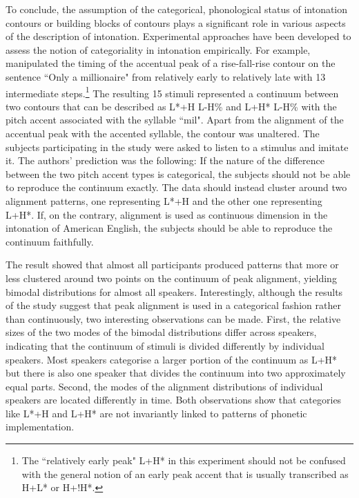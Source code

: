 To conclude, the assumption of the categorical, phonological status of intonation contours or building blocks of contours plays a significant role in various aspects of the description of intonation. Experimental approaches have been developed to assess the notion of categoriality in intonation empirically. For example, \citet{PierrehumbertSteele1989} manipulated the timing of the accentual peak of a rise-fall-rise contour on the sentence ``Only a millionaire" from relatively early to relatively late with 13 intermediate steps.\footnote{The ``relatively early peak" L+H* in this experiment should not be confused with the general notion of an early peak accent that is usually transcribed as H+L* or H+!H*.} The resulting 15 stimuli represented a continuum between two contours that can be described as L*+H L-H\% and L+H* L-H\% with the pitch accent associated with the syllable ``mil". Apart from the alignment of the accentual peak with the accented syllable, the contour was unaltered. The subjects participating in the study were asked to listen to a stimulus and imitate it. The authors' prediction was the following: If the nature of the difference between the two pitch accent types is categorical, the subjects should not be able to reproduce the continuum exactly. The data should instead cluster around two alignment patterns, one representing L*+H and the other one representing L+H*. If, on the contrary, alignment is used as continuous dimension in the intonation of American English, the subjects should be able to reproduce the continuum faithfully.

The result showed that almost all participants produced patterns that more or less clustered around two points on the continuum of peak alignment, yielding bimodal distributions for almost all speakers. Interestingly, although the results of the study suggest that peak alignment is used in a categorical fashion rather than continuously, two interesting observations can be made. First, the relative sizes of the two modes of the bimodal distributions differ across speakers, indicating that the continuum of stimuli is divided differently by individual speakers. Most speakers categorise a larger portion of the continuum as L+H* but there is also one speaker that divides the continuum into two approximately equal parts. Second, the modes of the alignment distributions of individual speakers are located differently in time. Both observations show that categories like L*+H and L+H* are not invariantly linked to patterns of phonetic implementation. 


